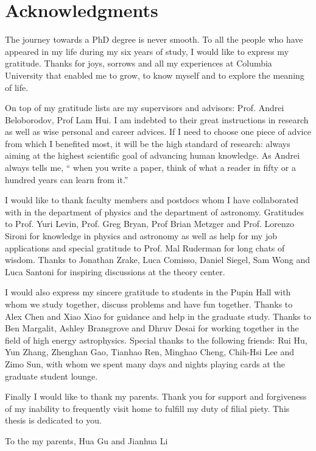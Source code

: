 \chapter*{Acknowledgments}
\label{chap:acknowledgments}

The journey towards a PhD degree is never smooth.
To all the people who have appeared in my life during my six years of study, I would like to express my gratitude.
Thanks for joys, sorrows and all my experiences at Columbia University that enabled me to grow, to know myself and to explore the meaning of life.

On top of my gratitude lists are my supervisors and advisors: Prof. Andrei Beloborodov, Prof Lam Hui.
I am indebted to their great instructions in research as well as wise personal and career advices. 
If I need to choose one piece of advice from which I benefited most, it will be the high standard of research: always aiming at the highest scientific goal of advancing human knowledge.
As Andrei always tells me, `` when you write a paper, think of what a reader in fifty or a hundred years can learn from it.''

I would like to thank faculty members and postdocs whom I have collaborated with in the department of physics and the department of astronomy.
Gratitudes to Prof. Yuri Levin, Prof. Greg Bryan, Prof Brian Metzger and Prof. Lorenzo Sironi for knowledge in physics and astronomy as well as help for my job applications and special gratitude to Prof. Mal Ruderman for long chats of wisdom.
Thanks to Jonathan Zrake, Luca Comisso, Daniel Siegel, Sam Wong and Luca Santoni for inspiring discussions at the theory center.

I would also express my sincere gratitude to students in the Pupin Hall with whom we study together, discuss problems and have fun together.
Thanks to Alex Chen and Xiao Xiao for guidance and help in the graduate study.
Thanks to Ben Margalit, Ashley Bransgrove and Dhruv Desai for working together in the field of high energy astrophysics.
Special thanks to the following friends: Rui Hu, Yun Zhang, Zhenghan Gao, Tianhao Ren, Minghao Cheng, Chih-Hsi Lee and Zimo Sun, with whom we spent many days and nights playing cards at the graduate student lounge.

Finally I would like to thank my parents. Thank you for support and forgiveness of my inability to frequently visit home to fulfill my duty of filial piety. This thesis is dedicated to you.

\newpage \vspace*{8cm}
\begin{center}
\large To the my parents, Hua Gu and Jianhua Li
\end{center}
